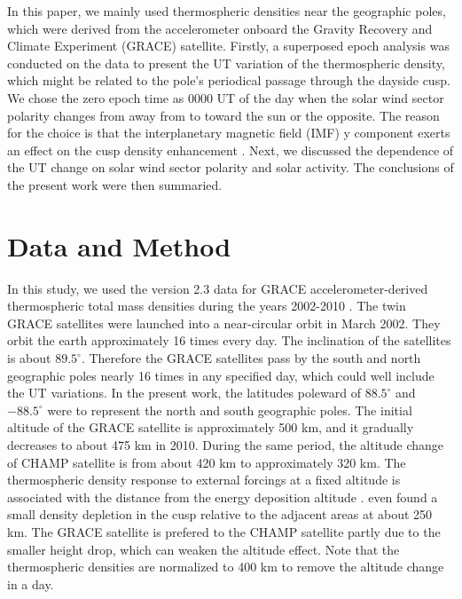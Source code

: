 \documentclass[draft, grl]{/home/guod/Documents/template/agu_template/AGUTeX}
\begin{document}
\begin{article}
    In this paper, we mainly used thermospheric densities near the geographic 
    poles, which were derived from the accelerometer onboard the Gravity 
    Recovery and Climate Experiment (GRACE) satellite. 
    Firstly, a superposed epoch analysis was conducted on the data to present 
    the UT variation of the thermospheric density, which might be related to the
    pole's periodical passage through the dayside cusp. 
    We chose the zero epoch time as 0000 UT of the day when the solar wind 
    sector polarity changes from away from to toward the sun or the opposite.
    The reason for the choice is that the interplanetary magnetic field (IMF) y 
    component exerts an effect on the cusp density enhancement
    \citep{Crowley2010, Knipp2011, Li2011}.
    Next, we discussed the dependence of the UT change on solar wind sector 
    polarity and solar activity.
    The conclusions of the present work were then summaried.

\section{Data and Method}
    In this study, we used the version 2.3 data for GRACE accelerometer-derived 
    thermospheric total mass densities during the years 2002-2010 
    \citep{Sutton2011}. 
    The twin GRACE satellites were launched into a near-circular orbit in March
    2002.
    They orbit the earth approximately 16 times every day.
    The inclination of the satellites is about $89.5^\circ$.
    Therefore the GRACE satellites pass by the south and north geographic 
    poles nearly 16 times in any specified day, which could well include the UT 
    variations.
    In the present work, the latitudes poleward of $88.5^\circ$ and 
    $-88.5^\circ$ were to represent the north and south geographic poles.
    The initial altitude of the GRACE satellite is approximately 500 km, and it 
    gradually decreases to about 475 km in 2010. 
    During the same period, the altitude change of CHAMP satellite is from 
    about 420 km to approximately 320 km.
    The thermospheric density response to external forcings at a fixed altitude 
    is associated with the distance from the energy deposition altitude 
    \citep{Lei2010a}.
    \citet{Clemmons2008} even found a small density depletion in the cusp 
    relative to the adjacent areas at about 250 km.
    The GRACE satellite is prefered to the CHAMP satellite partly due to the 
    smaller height drop, which can weaken the altitude effect.
    Note that the thermospheric densities are normalized to 400 km to remove the
    altitude change in a day.


\end{article}
\end{document}
